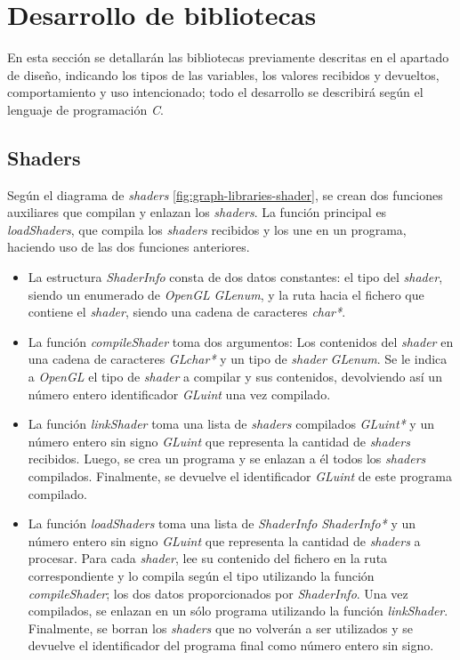 \section{Desarrollo de bibliotecas}
En esta sección se detallarán las bibliotecas previamente descritas en el apartado de diseño, indicando los tipos de las variables, los valores recibidos y devueltos, comportamiento y uso intencionado; todo el desarrollo se describirá según el lenguaje de programación \textit{C}.

\subsection{Shaders}
Según el diagrama de \textit{shaders} \ref{fig:graph-libraries-shader}, se crean dos funciones auxiliares que compilan y enlazan los \textit{shaders}. La función principal es \textit{loadShaders}, que compila los \textit{shaders} recibidos y los une en un programa, haciendo uso de las dos funciones anteriores.

\begin{itemize}
    \item La estructura \textit{ShaderInfo} consta de dos datos constantes: el tipo del \textit{shader}, siendo un enumerado de \textit{OpenGL} \textit{GLenum}, y la ruta hacia el fichero que contiene el \textit{shader}, siendo una cadena de caracteres \textit{char*}.

    \item La función \textit{compileShader} toma dos argumentos: Los contenidos del \textit{shader} en una cadena de caracteres \textit{GLchar*} y un tipo de \textit{shader} \textit{GLenum}. Se le indica a \textit{OpenGL} el tipo de \textit{shader} a compilar y sus contenidos, devolviendo así un número entero identificador \textit{GLuint} una vez compilado.

    \item La función \textit{linkShader} toma una lista de \textit{shaders} compilados \textit{GLuint*} y un número entero sin signo \textit{GLuint} que representa la cantidad de \textit{shaders} recibidos. Luego, se crea un programa y se enlazan a él todos los \textit{shaders} compilados. Finalmente, se devuelve el identificador \textit{GLuint} de este programa compilado.

    \item La función \textit{loadShaders} toma una lista de \textit{ShaderInfo} \textit{ShaderInfo*} y un número entero sin signo \textit{GLuint} que representa la cantidad de \textit{shaders} a procesar. Para cada \textit{shader}, lee su contenido del fichero en la ruta correspondiente y lo compila según el tipo utilizando la función \textit{compileShader}; los dos datos proporcionados por \textit{ShaderInfo}. Una vez compilados, se enlazan en un sólo programa utilizando la función \textit{linkShader}. Finalmente, se borran los \textit{shaders} que no volverán a ser utilizados y se devuelve el identificador del programa final como número entero sin signo.
\end{itemize}

